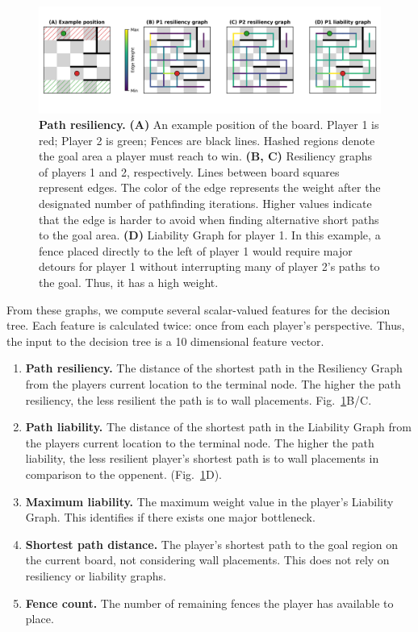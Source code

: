\documentclass[10pt]{article}
\begin{document}
\begin{figure}[H]
    \centering
    \includegraphics[width=\linewidth]{path_figure.png}
    \caption{\textbf{Path resiliency.} \textbf{(A)} An example position of the board. Player 1 is red; Player 2 is green; Fences are black lines. Hashed regions denote the goal area a player must reach to win. \textbf{(B, C)} Resiliency graphs of players 1 and 2, respectively. Lines between board squares represent edges. The color of the edge represents the weight after the designated number of pathfinding iterations. Higher values indicate that the edge is harder to avoid when finding alternative short paths to the goal area. \textbf{(D)} Liability Graph for player 1. In this example, a fence placed directly to the left of player 1 would require major detours for player 1 without interrupting many of player 2's paths to the goal. Thus, it has a high weight.}
    \label{fig:resiliency}
\end{figure}


From these graphs, we compute several scalar-valued features for the decision tree. Each feature is calculated twice: once from each player's perspective. Thus, the input to the decision tree is a 10 dimensional feature vector. 

\begin{enumerate}
    \item \textbf{Path resiliency.} The distance of the shortest path in the Resiliency Graph from the players current location to the terminal node. The higher the path resiliency, the less resilient the path is to wall placements. Fig.~\ref{fig:resiliency}B/C.
    \item \textbf{Path liability.} The distance of the shortest path in the Liability Graph from the players current location to the terminal node. The higher the path liability, the less resilient player's shortest path is to wall placements in comparison to the oppenent. (Fig.~\ref{fig:resiliency}D).
    \item \textbf{Maximum liability.} The maximum weight value in the player's Liability Graph. This identifies if there exists one major bottleneck.
    \item \textbf{Shortest path distance.} The player's shortest path to the goal region on the current board, not considering wall placements. This does not rely on resiliency or liability graphs.
    \item \textbf{Fence count.} The number of remaining fences the player has available to place.
\end{enumerate}
\end{document}
